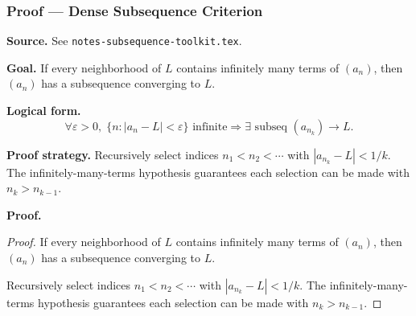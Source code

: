 
\clearpage
{}
\hypertarget{proof-RA-ABB-T-dense-subseq-criterion}{}

\subsubsection[Dense Subsequence Criterion]{Proof --- Dense Subsequence Criterion}

\bigskip

\noindent
\textbf{Source.}
See \texttt{notes-subsequence-toolkit.tex}.

\vspace{0.75em}

\noindent
\textbf{Goal.}
If every neighborhood of $L$ contains infinitely many terms of $(a_n)$, then $(a_n)$ has a subsequence converging to $L$.

\vspace{0.75em}

\noindent
\textbf{Logical form.}
\[
  \forall \varepsilon > 0,\; \{n : |a_n - L| < \varepsilon\} \text{ infinite} \Rightarrow \exists \text{ subseq } (a_{n_k}) \to L.
\]

\vspace{0.75em}

\noindent
\textbf{Proof strategy.}
Recursively select indices $n_1 < n_2 < \cdots$ with $|a_{n_k} - L| < 1/k$. The infinitely-many-terms hypothesis guarantees each selection can be made with $n_k > n_{k-1}$.

\vspace{0.75em}

\noindent
\textbf{Proof.}
\begin{proof}
\Claim If every neighborhood of $L$ contains infinitely many terms of $(a_n)$, then $(a_n)$ has a subsequence converging to $L$.

\Given 

\Goal 

\Strategy Recursively select indices $n_1 < n_2 < \cdots$ with $|a_{n_k} - L| < 1/k$. The infinitely-many-terms hypothesis guarantees each selection can be made with $n_k > n_{k-1}$.

\medskip


\end{proof}

